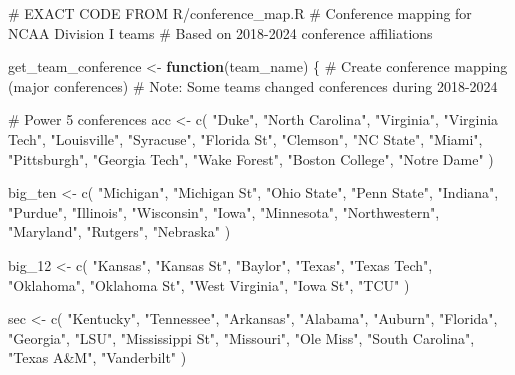 \documentclass[
  letterpaper,
  DIV=11,
  numbers=noendperiod]{scrartcl}
\newenvironment{Shaded}{\begin{snugshade}}{\end{snugshade}}
\newcommand{\CommentTok}[1]{\textcolor[rgb]{0.37,0.37,0.37}{#1}}
\newcommand{\ControlFlowTok}[1]{\textcolor[rgb]{0.00,0.23,0.31}{\textbf{#1}}}
\newcommand{\FunctionTok}[1]{\textcolor[rgb]{0.28,0.35,0.67}{#1}}
\newcommand{\NormalTok}[1]{\textcolor[rgb]{0.00,0.23,0.31}{#1}}
\newcommand{\OtherTok}[1]{\textcolor[rgb]{0.00,0.23,0.31}{#1}}
\newcommand{\StringTok}[1]{\textcolor[rgb]{0.13,0.47,0.30}{#1}}
\begin{document}
\begin{Shaded}
\begin{Highlighting}[]
\CommentTok{\# EXACT CODE FROM R/conference\_map.R}
\CommentTok{\# Conference mapping for NCAA Division I teams}
\CommentTok{\# Based on 2018{-}2024 conference affiliations}

\NormalTok{get\_team\_conference }\OtherTok{\textless{}{-}} \ControlFlowTok{function}\NormalTok{(team\_name) \{}
    \CommentTok{\# Create conference mapping (major conferences)}
    \CommentTok{\# Note: Some teams changed conferences during 2018{-}2024}

    \CommentTok{\# Power 5 conferences}
\NormalTok{    acc }\OtherTok{\textless{}{-}} \FunctionTok{c}\NormalTok{(}
        \StringTok{"Duke"}\NormalTok{, }\StringTok{"North Carolina"}\NormalTok{, }\StringTok{"Virginia"}\NormalTok{, }\StringTok{"Virginia Tech"}\NormalTok{, }\StringTok{"Louisville"}\NormalTok{,}
        \StringTok{"Syracuse"}\NormalTok{, }\StringTok{"Florida St"}\NormalTok{, }\StringTok{"Clemson"}\NormalTok{, }\StringTok{"NC State"}\NormalTok{, }\StringTok{"Miami"}\NormalTok{, }\StringTok{"Pittsburgh"}\NormalTok{,}
        \StringTok{"Georgia Tech"}\NormalTok{, }\StringTok{"Wake Forest"}\NormalTok{, }\StringTok{"Boston College"}\NormalTok{, }\StringTok{"Notre Dame"}
\NormalTok{    )}

\NormalTok{    big\_ten }\OtherTok{\textless{}{-}} \FunctionTok{c}\NormalTok{(}
        \StringTok{"Michigan"}\NormalTok{, }\StringTok{"Michigan St"}\NormalTok{, }\StringTok{"Ohio State"}\NormalTok{, }\StringTok{"Penn State"}\NormalTok{, }\StringTok{"Indiana"}\NormalTok{,}
        \StringTok{"Purdue"}\NormalTok{, }\StringTok{"Illinois"}\NormalTok{, }\StringTok{"Wisconsin"}\NormalTok{, }\StringTok{"Iowa"}\NormalTok{, }\StringTok{"Minnesota"}\NormalTok{, }\StringTok{"Northwestern"}\NormalTok{,}
        \StringTok{"Maryland"}\NormalTok{, }\StringTok{"Rutgers"}\NormalTok{, }\StringTok{"Nebraska"}
\NormalTok{    )}

\NormalTok{    big\_12 }\OtherTok{\textless{}{-}} \FunctionTok{c}\NormalTok{(}
        \StringTok{"Kansas"}\NormalTok{, }\StringTok{"Kansas St"}\NormalTok{, }\StringTok{"Baylor"}\NormalTok{, }\StringTok{"Texas"}\NormalTok{, }\StringTok{"Texas Tech"}\NormalTok{, }\StringTok{"Oklahoma"}\NormalTok{,}
        \StringTok{"Oklahoma St"}\NormalTok{, }\StringTok{"West Virginia"}\NormalTok{, }\StringTok{"Iowa St"}\NormalTok{, }\StringTok{"TCU"}
\NormalTok{    )}

\NormalTok{    sec }\OtherTok{\textless{}{-}} \FunctionTok{c}\NormalTok{(}
        \StringTok{"Kentucky"}\NormalTok{, }\StringTok{"Tennessee"}\NormalTok{, }\StringTok{"Arkansas"}\NormalTok{, }\StringTok{"Alabama"}\NormalTok{, }\StringTok{"Auburn"}\NormalTok{, }\StringTok{"Florida"}\NormalTok{,}
        \StringTok{"Georgia"}\NormalTok{, }\StringTok{"LSU"}\NormalTok{, }\StringTok{"Mississippi St"}\NormalTok{, }\StringTok{"Missouri"}\NormalTok{, }\StringTok{"Ole Miss"}\NormalTok{, }\StringTok{"South Carolina"}\NormalTok{,}
        \StringTok{"Texas A\&M"}\NormalTok{, }\StringTok{"Vanderbilt"}
\NormalTok{    )}


\end{Highlighting}
\end{Shaded}
\end{document}
